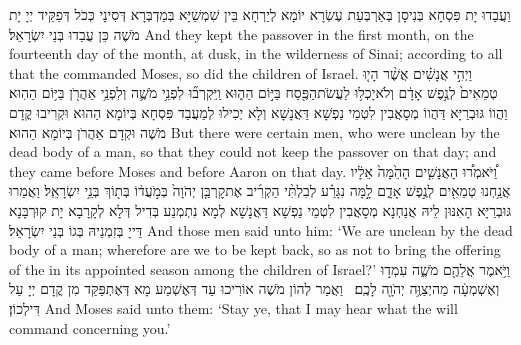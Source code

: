 {וַעֲבַדוּ יָת פִּסְחָא בְּנִיסָן בְּאַרְבְּעַת עֶשְׂרָא יוֹמָא לְיַרְחָא בֵּין שִׁמְשַׁיָּא בְּמַדְבְּרָא דְּסִינָי כְּכֹל דְּפַקֵּיד יְיָ יָת מֹשֶׁה כֵּן עֲבַדוּ בְּנֵי יִשְׂרָאֵל׃}
{And they kept the passover in the first month, on the fourteenth day of the month, at dusk, in the wilderness of Sinai; according to all that the \lord\space commanded Moses, so did the children of Israel.}{}
{וַיְהִ֣י אֲנָשִׁ֗ים אֲשֶׁ֨ר הָי֤וּ טְמֵאִים֙ לְנֶ֣פֶשׁ אָדָ֔ם וְלֹא\maqqaf יָכְל֥וּ לַעֲשֹׂת\maqqaf הַפֶּ֖סַח בַּיּ֣וֹם הַה֑וּא וַֽיִּקְרְב֞וּ לִפְנֵ֥י מֹשֶׁ֛ה וְלִפְנֵ֥י אַהֲרֹ֖ן בַּיּ֥וֹם הַהֽוּא׃}
{וַהֲווֹ גּוּבְרַיָּא דַּהֲווֹ מְסָאֲבִין לִטְמֵי נַפְשָׁא דַּאֲנָשָׁא וְלָא יְכִילוּ לְמַעֲבַד פִּסְחָא בְּיוֹמָא הַהוּא וּקְרִיבוּ קֳדָם מֹשֶׁה וּקְדָם אַהֲרֹן בְּיוֹמָא הַהוּא׃}
{But there were certain men, who were unclean by the dead body of a man, so that they could not keep the passover on that day; and they came before Moses and before Aaron on that day.}{}
{וַ֠יֹּאמְר֠וּ הָאֲנָשִׁ֤ים הָהֵ֙מָּה֙ אֵלָ֔יו אֲנַ֥חְנוּ טְמֵאִ֖ים לְנֶ֣פֶשׁ אָדָ֑ם לָ֣מָּה נִגָּרַ֗ע לְבִלְתִּ֨י הַקְרִ֜יב אֶת\maqqaf קׇרְבַּ֤ן יְהֹוָה֙ בְּמֹ֣עֲד֔וֹ בְּת֖וֹךְ בְּנֵ֥י יִשְׂרָאֵֽל׃}
{וַאֲמַרוּ גּוּבְרַיָּא הָאִנּוּן לֵיהּ אֲנַחְנָא מְסָאֲבִין לִטְמֵי נַפְשָׁא דַּאֲנָשָׁא לְמָא נִתְמְנַע בְּדִיל דְּלָא לְקָרָבָא יָת קוּרְבָּנָא דַּייָ בְּזִמְנֵיהּ בְּגוֹ בְּנֵי יִשְׂרָאֵל׃}
{And those men said unto him: ‘We are unclean by the dead body of a man; wherefore are we to be kept back, so as not to bring the offering of the \lord\space in its appointed season among the children of Israel?’}{}
{וַיֹּ֥אמֶר אֲלֵהֶ֖ם מֹשֶׁ֑ה עִמְד֣וּ וְאֶשְׁמְעָ֔ה מַה\maqqaf יְצַוֶּ֥ה יְהֹוָ֖ה לָכֶֽם׃ \petucha }
{וַאֲמַר לְהוֹן מֹשֶׁה אוֹרִיכוּ עַד דְּאֶשְׁמַע מָא דְּאֶתְפַּקַּד מִן קֳדָם יְיָ עַל דִּילְכוֹן׃}
{And Moses said unto them: ‘Stay ye, that I may hear what the \lord\space will command concerning you.’}{}
